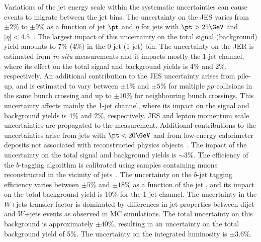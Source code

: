 \documentclass[final,3p,times,twocolumn]{elsarticle}
\newcommand{\OneJet}{\mbox{1-jet}}
\def\WjetsSRErrorEle{\ensuremath{40\%}}
\begin{document}
Variations of the jet energy scale within the systematic uncertainties can cause events to migrate between the jet bins.
The uncertainty on the JES varies from $\pm 2$\% to $\pm 9$\% as a function of
jet $\pt$ and $\eta$ for jets with  $\pt > 25\GeV$ and $|\eta| < 4.5$~\cite{JES}. 
The largest impact of this uncertainty on the total signal (background) yield amounts to 7\% (4\%) in the 0-jet (1-jet) bin.
The uncertainty on the JER is estimated from \emph{in situ} measurements and it impacts
mostly the \OneJet{} channel, where its effect on the total signal and background yields is 4\% and 2\%, respectively.
An additional contribution to the JES uncertainty arises from pile-up, and is estimated to vary between $\pm 1$\%
and $\pm 5$\% for multiple $pp$ collisions in the same bunch crossing 
and up to $\pm 10$\% for neighbouring bunch crossings. This uncertainty affects mainly the 
\OneJet{} channel, where its impact on the signal and background yields is 4\%  and 2\%, respectively.
JES and lepton momentum scale uncertainties are propagated to the
\met{} measurement. Additional contributions to the \met{} uncertainties arise from jets with $\pt < 20\GeV$
and from low-energy calorimeter deposits not associated with reconstructed
physics objects~\cite{MET}. 
The impact of the \met{} uncertainty on the total signal and background yields is $\sim$3\%.
The efficiency of the $b$-tagging algorithm is calibrated
using samples containing muons reconstructed in the vicinity of
jets~\cite{ATLAS-CONF-2012-043}. The uncertainty on the $b$-jet tagging
efficiency varies between $\pm 5$\% and $\pm 18$\%  as a function of the jet \pt{}, and its 
impact on the total background yield is 10\% for the \OneJet{} channel. 
The uncertainty in the $W$+jets transfer factor is dominated by differences in jet properties between dijet and
$W$+jets events as observed in MC simulations.
The total uncertainty on this background is approximately $\pm \WjetsSRErrorEle$, resulting in an uncertainty on  
the total background yield of 5\%.
The uncertainty on the integrated luminosity is $\pm 3.6$\%.		
\end{document}
